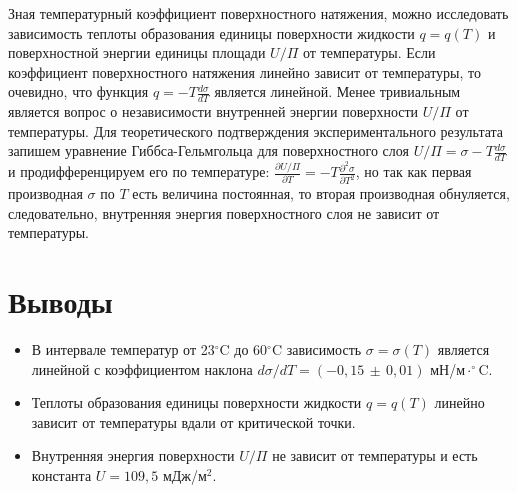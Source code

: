 \documentclass[a4paper,12pt]{article} %
\begin{document}
	Зная температурный коэффициент поверхностного натяжения, можно исследовать зависимость теплоты образования единицы поверхности жидкости $q = q(T)$ и поверхностной энергии единицы площади $U/\Pi$ от температуры. Если коэффициент поверхностного натяжения линейно зависит от температуры, то очевидно, что функция $q =-T\frac{d\sigma}{dT}$ является линейной. Менее тривиальным является вопрос о независимости внутренней энергии поверхности $U/\Pi$ от температуры. Для теоретического подтверждения экспериментального результата запишем уравнение Гиббса-Гельмгольца для поверхностного слоя $U/\Pi = \sigma - T\frac{d\sigma}{dT}$ и продифференцируем его по температуре: $\frac{\partial U/\Pi}{\partial T} = -T \frac{\partial^2 \sigma}{\partial T^2}$, но так как первая производная $\sigma$ по $T$ есть величина постоянная, то вторая производная обнуляется, следовательно, внутренняя энергия поверхностного слоя не зависит от температуры.
	
	
\section*{Выводы}
\begin{itemize}
	\item 
		В интервале температур от 23$^\circ$C до 60$^\circ$C зависимость $\sigma = \sigma(T)$ является линейной с коэффициентом наклона $d\sigma / dT = (-0,15\,\pm\, 0,01)$  мН/м$\cdot^\circ$C.
	\item 
		Теплоты образования единицы поверхности жидкости $q = q(T)$ линейно зависит от температуры вдали от критической точки.
	\item 	
		Внутренняя энергия поверхности $U/\Pi$ не зависит от температуры и есть константа $U = 109,5$ мДж/м$^2$.
\end{itemize}	
\end{document}
